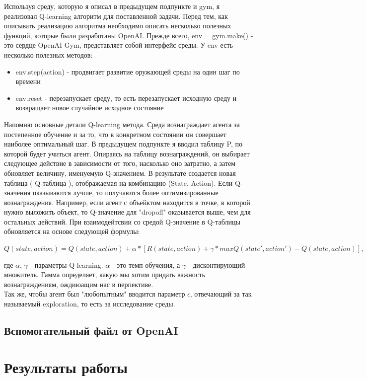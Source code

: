 \documentclass[12pt, a4paper]{report}
\theoremstyle{definition}
\theoremstyle{plain}
\theoremstyle{remark}
\theoremstyle{remark}
\theoremstyle{definition}
\begin{document}
Используя среду, которую я описал в предыдущем подпункте и gym, я реализовал Q-learning алгоритм для поставленной задачи. Перед тем, как описывать реализацию алгоритма необходимо описать несколько полезных функций, которые были разработаны OpenAI. Прежде всего, env = gym.make() - это сердце OpenAI Gym, представляет собой интерфейс среды. У env есть несколько полезных методов:
\begin{itemize}
    \item env.step(action) - продвигает развитие оружающей среды на один шаг по времени
    \item env.reset - перезапускает среду, то есть перезапускает исходную среду и возвращает новое случайное исходное состояние
\end{itemize}
Напомню основные детали Q-learning метода. Среда вознаграждает агента за постепенное обучение и за то, что в конкретном состоянии он совершает наиболее оптимальный шаг. В предыдущем подпункте я вводил таблицу P, по которой будет учиться агент. Опираясь на таблицу вознаграждений, он выбирает следующее действие в зависимости от того, насколько оно затратно, а затем обновляет величину, именуемую Q-значением. В результате создается новая таблица ( Q-таблица ), отображаемая на комбинацию (State, Action). Если Q-значения оказываются лучше, то получаются более оптимизированные вознаграждения. Например, если агент с объейктом находится в точке, в которой нужно выложить объект, то Q-значение для "dropoff" оказывается выше, чем для остальных действий. При взаимодейтсвии со средой Q-значение в Q-таблицы обновляется на основе следующей формулы:
\begin{center}
    $    Q(state, action) = Q(state,action) + \alpha*[R(state, action) + \gamma*maxQ(state', action') - Q(state,action)],$
\end{center}
где $\alpha$, $\gamma$ - параметры Q-learning. $\alpha$ - это темп обучения, а $\gamma$ - дисконтирующий множитель. Гамма определяет, какую мы хотим придать важность вознаграждениям, ождиюащим нас в перпективе.\\

Так же, чтобы агент был "любопытным" вводится параметр $\epsilon$, отвечающий за так называемый exploration, то есть за исследование среды.
\subsection{Вспомогательный файл от OpenAI}

\section{Результаты работы}
\end{document}
